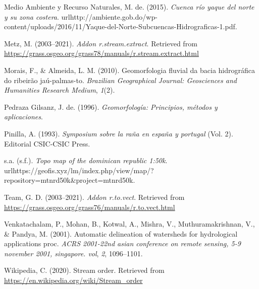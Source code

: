 \documentclass[11pt,]{article}
\begin{document}
\hypertarget{ref-Mmar2015cuenca}{}
Medio Ambiente y Recurso Naturales, M. de. (2015). \emph{Cuenca río
yaque del norte y su zona costera}.
urlhttp://ambiente.gob.do/wp-content/uploads/2016/11/Yaque-del-Norte-Subcuencas-Hidrograficas-1.pdf.

\hypertarget{ref-streamnextractmarkus}{}
Metz, M. (2003--2021). \emph{Addon r.stream.extract}. Retrieved from
\url{https://grass.osgeo.org/grass78/manuals/r.stream.extract.html}

\hypertarget{ref-morais2010geomorfologia}{}
Morais, F., \& Almeida, L. M. (2010). Geomorfologia fluvial da bacia
hidrográfica do ribeirão jaú-palmas-to. \emph{Brazilian Geographical
Journal: Geosciences and Humanities Research Medium}, \emph{1}(2).

\hypertarget{ref-pedraza1996geomorfologia}{}
Pedraza Gilsanz, J. de. (1996). \emph{Geomorfología: Principios, métodos
y aplicaciones}.

\hypertarget{ref-pinilla1993symposium}{}
Pinilla, A. (1993). \emph{Symposium sobre la raña en españa y portugal}
(Vol. 2). Editorial CSIC-CSIC Press.

\hypertarget{ref-TopoMap}{}
s.a. (s.f.). \emph{Topo map of the dominican republic 1:50k}.
urlhttps://geofis.xyz/lm/index.php/view/map/?repository=mtnrd50k\&project=mtnrd50k.

\hypertarget{ref-tovect}{}
Team, G. D. (2003--2021). \emph{Addon r.to.vect}. Retrieved from
\url{https://grass.osgeo.org/grass76/manuals/r.to.vect.html}

\hypertarget{ref-venkatachalam2001automatic}{}
Venkatachalam, P., Mohan, B., Kotwal, A., Mishra, V., Muthuramakrishnan,
V., \& Pandya, M. (2001). Automatic delineation of watersheds for
hydrological applications proc. \emph{ACRS 2001-22nd asian conference on
remote sensing, 5-9 november 2001, singapore. vol}, \emph{2},
1096--1101.

\hypertarget{ref-wikipedia2020stream}{}
Wikipedia, C. (2020). Stream order. Retrieved from
\url{https://en.wikipedia.org/wiki/Stream_order}




\newpage
\singlespacing 
\end{document}
